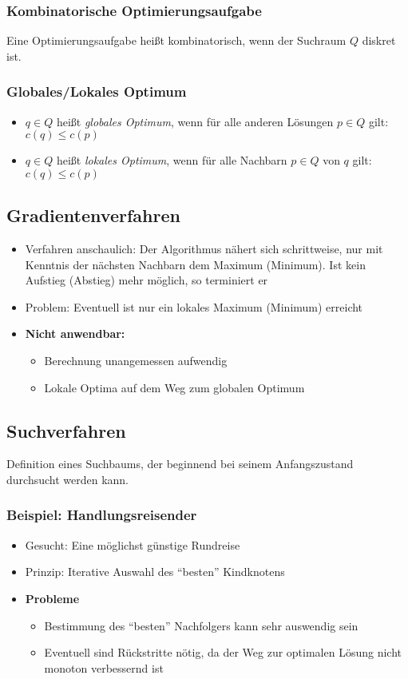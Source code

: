 \subsubsection{Kombinatorische Optimierungsaufgabe}
Eine Optimierungsaufgabe heißt kombinatorisch, wenn der Suchraum \(Q\) diskret ist.

\subsubsection{Globales/Lokales Optimum}
\begin{itemize}
	\item \(q \in Q\) heißt \textit{globales Optimum}, wenn für alle anderen Lösungen \(p \in Q\) gilt: \(c(q) \leq c(p)\)
	\item \(q \in Q\) heißt \textit{lokales Optimum}, wenn für alle Nachbarn \(p \in Q\) von \(q\) gilt: \(c(q) \leq c(p)\)
\end{itemize}


\subsection{Gradientenverfahren}
\begin{itemize}
	\item Verfahren anschaulich: Der Algorithmus nähert sich schrittweise, nur mit Kenntnis der nächsten Nachbarn dem Maximum (Minimum). Ist kein Aufstieg (Abstieg) mehr möglich, so terminiert er
	\item Problem: Eventuell ist nur ein lokales Maximum (Minimum) erreicht
	\item \textbf{Nicht anwendbar:}
	\begin{itemize}
		\item Berechnung unangemessen aufwendig
		\item Lokale Optima auf dem Weg zum globalen Optimum
	\end{itemize}
\end{itemize}


\subsection{Suchverfahren}
Definition eines Suchbaums, der beginnend bei seinem Anfangszustand durchsucht werden kann.

\subsubsection{Beispiel: Handlungsreisender}
\begin{itemize}
	\item Gesucht: Eine möglichst günstige Rundreise
	\item Prinzip: Iterative Auswahl des "`besten"' Kindknotens
	\item \textbf{Probleme}
	\begin{itemize}
		\item Bestimmung des "`besten"' Nachfolgers kann sehr auswendig sein
		\item Eventuell sind Rückstritte nötig, da der Weg zur optimalen Lösung nicht monoton verbessernd ist
	\end{itemize}
\end{itemize}


